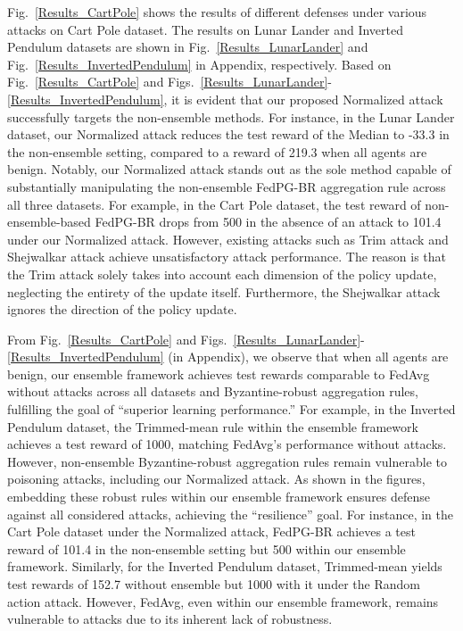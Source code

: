 Fig.~\ref{Results_CartPole} shows the results of different defenses under various attacks on Cart Pole dataset.
The results on Lunar Lander and Inverted Pendulum datasets are shown in Fig.~\ref{Results_LunarLander} and Fig.~\ref{Results_InvertedPendulum} in Appendix, respectively.
%
%
Based on Fig.~\ref{Results_CartPole} and Figs.~\ref{Results_LunarLander}-\ref{Results_InvertedPendulum}, it is evident that our proposed Normalized attack successfully targets the non-ensemble methods. 
%
For instance, in the Lunar Lander dataset, our Normalized attack reduces the test reward of the Median to -33.3 in the non-ensemble setting, compared to a reward of 219.3 when all agents are benign.
%
Notably, our Normalized attack stands out as the sole method capable of substantially manipulating the non-ensemble FedPG-BR aggregation rule across all three datasets. For example, in the Cart Pole dataset, the test reward of non-ensemble-based FedPG-BR drops from 500 in the absence of an attack to 101.4 under our Normalized attack.
%
However, existing attacks such as Trim attack and Shejwalkar attack achieve unsatisfactory attack performance.
%
The reason is that the Trim attack solely takes into account each dimension of the policy update, neglecting the entirety of the update itself. Furthermore, the Shejwalkar attack ignores the direction of the policy update.
%




%
%
%
From Fig.~\ref{Results_CartPole} and Figs.~\ref{Results_LunarLander}-\ref{Results_InvertedPendulum} (in Appendix), we observe that when all agents are benign, our ensemble framework achieves test rewards comparable to FedAvg without attacks across all datasets and Byzantine-robust aggregation rules, fulfilling the goal of “superior learning performance.” 
%
For example, in the Inverted Pendulum dataset, the Trimmed-mean rule within the ensemble framework achieves a test reward of 1000, matching FedAvg's performance without attacks. However, non-ensemble Byzantine-robust aggregation rules remain vulnerable to poisoning attacks, including our Normalized attack.
%
As shown in the figures, embedding these robust rules within our ensemble framework ensures defense against all considered attacks, achieving the “resilience” goal. For instance, in the Cart Pole dataset under the Normalized attack, FedPG-BR achieves a test reward of 101.4 in the non-ensemble setting but 500 within our ensemble framework. Similarly, for the Inverted Pendulum dataset, Trimmed-mean yields test rewards of 152.7 without ensemble but 1000 with it under the Random action attack. 
%
However, FedAvg, even within our ensemble framework, remains vulnerable to attacks due to its inherent lack of robustness.









